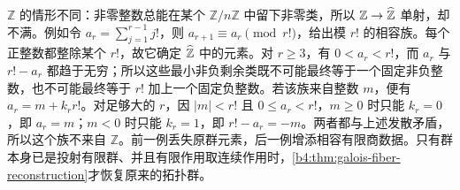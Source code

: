 \ProseParagraphBreak
\(\mathbb Z\) 的情形不同：非零整数总能在某个 \(\mathbb Z/n\mathbb Z\) 中留下非零类，所以 \(\mathbb Z\to\widehat{\vphantom{Z}\mathbb Z}\) 单射，却不满。例如令 \(a_r=\sum_{j=1}^{r-1}j!\)，则 \(a_{r+1}\equiv a_r\pmod{r!}\)，给出模 \(r!\) 的相容族。每个正整数都整除某个 \(r!\)，故它确定 \(\widehat{\vphantom{Z}\mathbb Z}\) 中的元素。对 \(r\ge3\)，有 \(0<a_r<r!\)，而 \(a_r\) 与 \(r!-a_r\) 都趋于无穷；所以这些最小非负剩余类既不可能最终等于一个固定非负整数，也不可能最终等于 \(r!\) 加上一个固定负整数。若该族来自整数 \(m\)，便有 \(a_r=m+k_rr!\)。对足够大的 \(r\)，因 \(|m|<r!\) 且 \(0\le a_r<r!\)，\(m\ge0\) 时只能 \(k_r=0\)，即 \(a_r=m\)；\(m<0\) 时只能 \(k_r=1\)，即 \(r!-a_r=-m\)。两者都与上述发散矛盾，所以这个族不来自 \(\mathbb Z\)。前一例丢失原群元素，后一例增添相容有限商数据。只有群本身已是投射有限群、并且有限作用取连续作用时，\cref{b4:thm:galois-fiber-reconstruction}才恢复原来的拓扑群。
